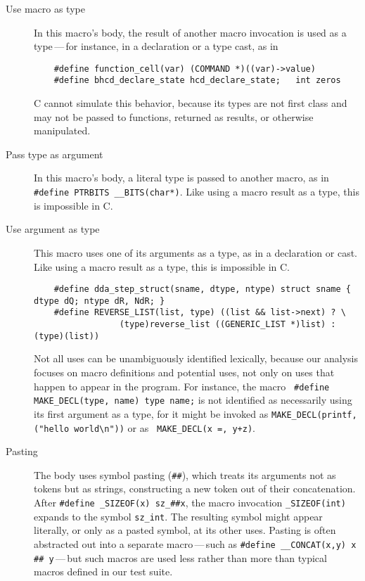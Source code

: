 \documentclass[10pt]{article}
\begin{document}
\begin{description}

\item[Use macro as type]
  In this macro's body, the result of another macro invocation is used as a
  type\,---\,for instance, in a declaration or a type cast, as in 
\begin{verbatim}
    #define function_cell(var) (COMMAND *)((var)->value)
    #define bhcd_declare_state hcd_declare_state;   int zeros
\end{verbatim}
  C cannot
  simulate this behavior, because its types are not first class and may not
  be passed to functions, returned as results, or otherwise manipulated.

\item[Pass type as argument]
  In this macro's body, a literal type is passed to another macro, as in
  {\tt \#define PTRBITS \verb|__BITS|(char*)}.  Like using a macro result
  as a type, this is impossible in C\@.

\item[Use argument as type]
  This macro uses one of its arguments as a type, as in a declaration or
  cast.  Like using a macro result as a type, this is impossible in C\@.
\begin{verbatim}
    #define dda_step_struct(sname, dtype, ntype) struct sname { dtype dQ; ntype dR, NdR; }
    #define REVERSE_LIST(list, type) ((list && list->next) ? \
                 (type)reverse_list ((GENERIC_LIST *)list) : (type)(list))
\end{verbatim}
  Not all uses can be unambiguously identified lexically, because our
  analysis focuses on macro definitions and potential uses, not only on
  uses that happen to appear in the program.  For instance, the macro {\tt
  \#define \verb|MAKE_DECL|(type, name) type name;} is not identified as
  necessarily using its first argument as a type, for it might be invoked as
  {\tt \verb|MAKE_DECL|(printf, ("hello world\verb|\|n"))} or as {\tt
  \verb|MAKE_DECL|(x =, y+z)}.

\item[Pasting]\label{def:pasting}
  The body uses symbol pasting ({\tt \#\#}), which treats its arguments not
  as tokens but as strings, constructing a new token out of their
  concatenation.  After {\tt \#define \verb|_SIZEOF|(x) \verb|sz_|\#\#x},
  the macro invocation {\tt \verb|_SIZEOF|(int)} expands to the 
  symbol {\tt \verb|sz_int|}.  The resulting symbol might appear literally, or
  only as a pasted symbol, at its other uses.  Pasting is often
  abstracted out into a separate macro\,---\,such as {\tt \#define
  \verb|__CONCAT|(x,y) x \#\# y}\,---\,but such macros are used less
  rather than more than typical macros defined in our test suite.


\end{description}
\end{document}
